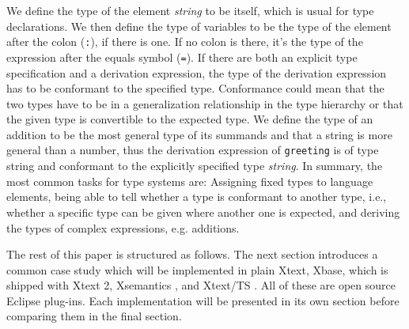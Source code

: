 We define the type of the element \emph{string} to be itself, which is usual for
type declarations. We then define the type of variables to be the type of the
element after the colon (\verb|:|), if there is one. If no colon is there,
it's the type of the expression after the equals symbol (\verb|=|).
If there are both an explicit type specification and a derivation expression,
the type of the derivation expression has to be conformant to the specified
type. Conformance could mean that the two types have to be in a generalization
relationship in the type hierarchy or that the given type is convertible to the
expected type. We define the type of an addition to be the most general type of
its summands and that a string is more general than a number, thus the
derivation expression  of \verb|greeting| is of type string and conformant to
the explicitly specified type \emph{string}. In summary, the most common
tasks for type systems are:
Assigning fixed types to language elements, being able to tell whether a
type is conformant to another type, i.e., whether a specific type can be given
where another one is expected, and deriving the types of complex expressions, e.g.
additions.

The rest of this paper is structured as follows. The next section introduces a
common case study which will be implemented in plain Xtext, Xbase, which is
shipped with Xtext 2, Xsemantics \cite{lbts}, and Xtext/TS \cite{mvts}. All of
these are open source Eclipse plug-ins. Each implementation will be presented in
its own section before comparing them in the final section.
